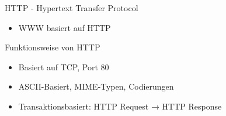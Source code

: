 \begin{definition}{HTTP - Hypertext Transfer Protocol}
    \begin{itemize}
        \item WWW basiert auf HTTP
    \end{itemize}
    Funktionsweise von HTTP
    \begin{itemize}
        \item Basiert auf TCP, Port 80
        \item ASCII-Basiert, MIME-Typen, Codierungen
        \item Transaktionsbasiert: HTTP Request → HTTP Response
    \end{itemize}
\end{definition}


